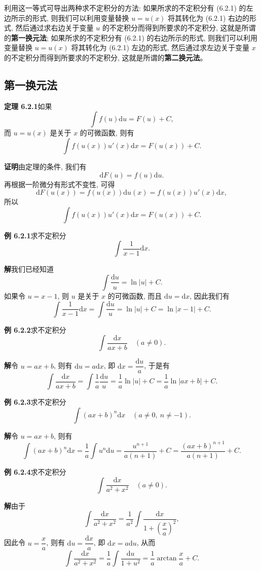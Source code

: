\documentclass[UTF8, 12pt, fontset=fandol, oneside]{ctexart}
\begin{document}
利用这一等式可导出两种求不定积分的方法: 如果所求的不定积分有 (6.2.1) 的左边所示的形式, 则我们可以利用变量替换 $u=u(x)$ 将其转化为 (6.2.1) 右边的形式, 然后通过求右边关于变量 $u$ 的不定积分而得到所要求的不定积分, 这就是所谓的\textbf{第一换元法}; 如果所求的不定积分有 (6.2.1) 的右边所示的形式, 则我们可以利用变量替换 $u=u(x)$ 将其转化为 (6.2.1) 左边的形式, 然后通过求左边关于变量 $x$ 的不定积分而得到所要求的不定积分, 这就是所谓的\textbf{第二换元法}。

\subsection{第一换元法}

\noindent\textbf{定理 6.2.1}\quad 如果
\[
  \int f(u)\mathrm du=F(u)+C,
\]
而 $u=u(x)$ 是关于 $x$ 的可微函数, 则有
\[
  \int f(u(x))u'(x)\mathrm dx=F(u(x))+C.
\]

\noindent\textbf{证明}\quad 由定理的条件, 我们有
\[
  \mathrm dF(u)=f(u)\mathrm du.
\]
再根据一阶微分有形式不变性, 可得
\[
  \mathrm dF(u(x))=f(u(x))\mathrm du(x)=f(u(x))u'(x)\mathrm dx,
\]
所以
\[
  \int f(u(x))u'(x)\mathrm dx=F(u(x))+C.
\]

\noindent\textbf{例 6.2.1}\quad 求不定积分
\[
  \int\frac1{x-1}\mathrm dx.
\]

\noindent\textbf{解}\quad 我们已经知道
\[
  \int\frac{\mathrm du}{u}=\ln|u|+C.
\]
如果令 $u=x-1$, 则 $u$ 是关于 $x$ 的可微函数, 而且 $\mathrm du=\mathrm dx$, 因此我们有
\[
  \int\frac1{x-1}\mathrm dx
  =
  \int\frac{\mathrm du}{u}
  =
  \ln|u|+C
  =
  \ln|x-1|+C.
\]

\noindent\textbf{例 6.2.2}\quad 求不定积分
\[
  \int\frac{\mathrm dx}{ax+b}\quad (a\ne0).
\]

\noindent\textbf{解}\quad 令 $u=ax+b$, 则有 $\mathrm du=a\mathrm dx$, 即 $\mathrm dx=\dfrac{\mathrm du}{a}$, 于是有
\[
  \int\frac{\mathrm dx}{ax+b}
  =
  \int\frac1a\frac{\mathrm du}{u}
  =
  \frac1a\ln|u|+C
  =
  \frac1a\ln|ax+b|+C.
\]

\noindent\textbf{例 6.2.3}\quad 求不定积分
\[
  \int(ax+b)^n\mathrm dx\quad (a\ne0,\ n\ne-1).
\]

\noindent\textbf{解}\quad 令 $u=ax+b$, 则有
\[
  \int(ax+b)^n\mathrm dx
  =
  \frac1a\int u^n\mathrm du
  =
  \frac{u^{n+1}}{a(n+1)}+C
  =
  \frac{(ax+b)^{n+1}}{a(n+1)}+C.
\]

\noindent\textbf{例 6.2.4}\quad 求不定积分
\[
  \int\frac{\mathrm dx}{a^2+x^2}\quad (a\ne0).
\]

\noindent\textbf{解}\quad 由于
\[
  \int\frac{\mathrm dx}{a^2+x^2}
  =
  \frac1{a^2}\int\frac{\mathrm dx}{1+\left(\dfrac xa\right)^2},
\]
因此令 $u=\dfrac xa$, 则有 $\mathrm du=\dfrac{\mathrm dx}{a}$, 即 $\mathrm dx=a\mathrm du$, 从而
\[
  \int\frac{\mathrm dx}{a^2+x^2}
  =
  \frac1a\int\frac{\mathrm du}{1+u^2}
  =
  \frac1a\arctan\frac xa+C.
\]
\end{document}
